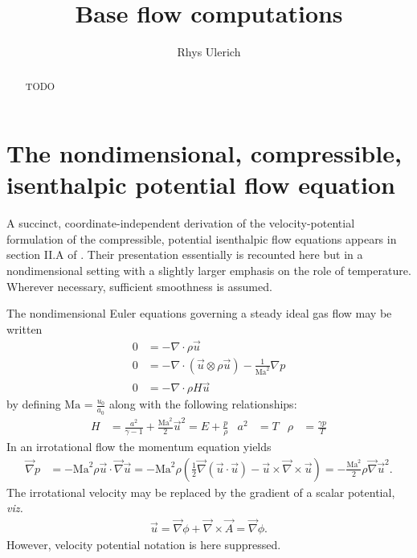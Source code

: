 \documentclass[letterpaper,11pt,nointlimits,reqno]{amsart}
\newcommand{\Mach}[1][]{\mbox{Ma}_{#1}}
\begin{document}
\title{Base flow computations}
\author{Rhys Ulerich}

\begin{abstract}
TODO
\end{abstract}

\maketitle

\tableofcontents

\section{The nondimensional, compressible, isenthalpic potential flow equation}

A succinct, coordinate-independent derivation of the velocity-potential
formulation of the compressible, potential isenthalpic flow equations appears
in section II.A of \citet{Saad2011Coordinate}.  Their presentation essentially
is recounted here but in a nondimensional setting with a slightly larger
emphasis on the role of temperature. Wherever necessary, sufficient smoothness
is assumed.

The nondimensional Euler equations governing a steady ideal gas flow may be written
\begin{align}
  \label{eq:continuity}
  0
&=
  - \nabla\cdot\rho{}\vec{u}
  \\
  \label{eq:momentum}
  0
&=
  - \nabla\cdot(\vec{u}\otimes\rho{}\vec{u})
  - \frac{1}{\Mach^{2}} \nabla{} p
  \\
  \label{eq:energy}
  0
&=
  - \nabla\cdot\rho{}H\vec{u}
\end{align}
by defining $\Mach = \frac{u_{0}}{a_{0}}$ along with the following
relationships:
\begin{align}
  \label{eq:eos}
  H &= \frac{a^2}{\gamma-1} + \frac{\Mach^2}{2}\vec{u}^2
     = E + \frac{p}{\rho}
  &
  a^2 &= T
  &
  \rho &= \frac{\gamma{} p}{T}
\end{align}
In an irrotational flow the momentum equation yields
\begin{align}
    \vec{\nabla}p
    &= - \Mach^2 \rho \vec{u}\cdot\vec{\nabla}\vec{u}
     = - \Mach^2 \rho \left(
           \frac{1}{2}\vec{\nabla}\left(\vec{u}\cdot\vec{u}\right)
         - \vec{u}\times\vec{\nabla}\times\vec{u}
        \right)
     = - \frac{\Mach^2}{2} \rho \vec{\nabla}\vec{u}^2.
\label{eq:irrot_momentum}
\end{align}
The irrotational velocity may be replaced by the gradient of a scalar
potential, \emph{viz.}
\begin{align}
  \vec{u} = \vec{\nabla}\phi + \vec{\nabla}\times\vec{A} = \vec{\nabla}{\phi}.
\end{align}
However, velocity potential notation is here suppressed.
\end{document}
